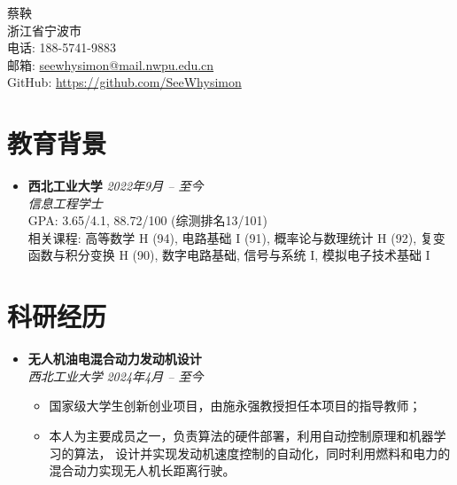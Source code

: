 \documentclass[a4paper,10pt]{article}
\begin{document}
	
	\begin{center}
		{\LARGE 蔡鞅}\\
		\vspace{0.1cm}
		浙江省宁波市 \\ 
		电话: 188-5741-9883 \\ 
		邮箱: \href{mailto:seewhysimon@mail.nwpu.edu.cn}{seewhysimon@mail.nwpu.edu.cn} \\ 
		GitHub: \href{https://github.com/SeeWhysimon}{https://github.com/SeeWhysimon} %
	\end{center}

\section*{教育背景}
\begin{itemize}[leftmargin=0.5cm]
    \item \textbf{西北工业大学} \hfill \textit{2022年9月 -- 至今} \\ 
    \textit{信息工程学士} \\ 
    GPA: 3.65/4.1, 88.72/100 (综测排名13/101) \\ 
    相关课程: 高等数学 H (94), 
                      电路基础 I (91), 
                      概率论与数理统计 H (92), 
                      复变函数与积分变换 H (90), 
                      数字电路基础, 
                      信号与系统 I, 
                      模拟电子技术基础 I
\end{itemize}

\section*{科研经历}
\begin{itemize}[leftmargin=0.5cm]
    \item \textbf{无人机油电混合动力发动机设计} \\ 
    \textit{西北工业大学} \hfill \textit{2024年4月 -- 至今} 
    
    \begin{itemize}
        \item 国家级大学生创新创业项目，由施永强教授担任本项目的指导教师；
        \item 本人为主要成员之一，负责算法的硬件部署，利用自动控制原理和机器学习的算法，
              设计并实现发动机速度控制的自动化，同时利用燃料和电力的混合动力实现无人机长距离行驶。
    \end{itemize}
    
\end{itemize}
\end{document}
